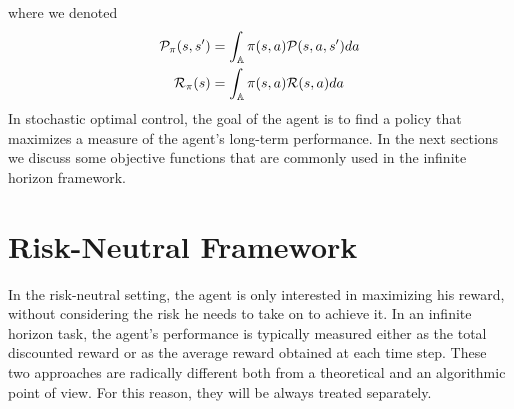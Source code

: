 where we denoted 
\begin{equation*}
	\begin{split}
		\mathcal{P}_\pi(s, s') &= \int_{\mathbb{A}} \pi(s, a) \mathcal{P}(s, a, s') da\\
		\mathcal{R}_\pi(s) &= \int_{\mathbb{A}} \pi(s, a) \mathcal{R}(s, a) da\\
	\end{split}
\end{equation*}
In stochastic optimal control, the goal of the agent is to find a policy that
maximizes a measure of the agent's long-term performance. In the next sections
we discuss some objective functions that are commonly used in the infinite
horizon framework. 

\section{Risk-Neutral Framework}
In the risk-neutral setting, the agent is only interested in maximizing his reward, without considering the risk he needs to take on to achieve it. In an infinite horizon task, the agent's performance is typically measured either as the total discounted reward or as the average reward obtained at each time step. These two approaches are radically different both from a theoretical and an algorithmic point of view. For this reason, they will be always treated separately.  

